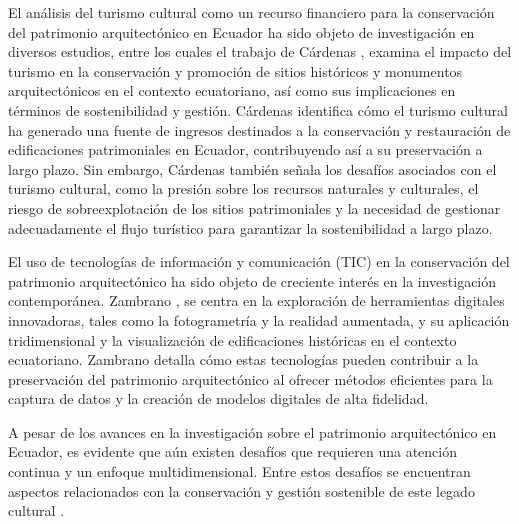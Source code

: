 \documentclass[journal,article,submit,pdftex,moreauthors]{Definitions/mdpi}
\begin{document}
El análisis del turismo cultural como un recurso financiero para la conservación del patrimonio arquitectónico en Ecuador ha sido objeto de investigación en diversos estudios, entre los cuales el trabajo de Cárdenas \cite{art:articulo19}, examina el impacto del turismo en la conservación y promoción de sitios históricos y monumentos arquitectónicos en el contexto ecuatoriano, así como sus implicaciones en términos de sostenibilidad y gestión. Cárdenas identifica cómo el turismo cultural ha generado una fuente de ingresos destinados a la conservación y restauración de edificaciones patrimoniales en Ecuador, contribuyendo así a su preservación a largo plazo. Sin embargo, Cárdenas también señala los desafíos asociados con el turismo cultural, como la presión sobre los recursos naturales y culturales, el riesgo de sobreexplotación de los sitios patrimoniales y la necesidad de gestionar adecuadamente el flujo turístico para garantizar la sostenibilidad a largo plazo.

El uso de tecnologías de información y comunicación (TIC) en la conservación del patrimonio arquitectónico ha sido objeto de creciente interés en la investigación contemporánea. Zambrano \cite{art:articulo20}, se centra en la exploración de herramientas digitales innovadoras, tales como la fotogrametría y la realidad aumentada, y su aplicación tridimensional y la visualización de edificaciones históricas en el contexto ecuatoriano. Zambrano detalla cómo estas tecnologías pueden contribuir a la preservación  del patrimonio arquitectónico al ofrecer métodos eficientes para la captura de datos y la creación de modelos digitales de alta fidelidad.

A pesar de los avances en la investigación sobre el patrimonio arquitectónico en Ecuador, es evidente que aún existen desafíos que requieren una atención continua y un enfoque multidimensional. Entre estos desafíos se encuentran aspectos relacionados con la conservación y gestión sostenible de este legado cultural \cite{art:articulo22}.  
 
\end{document}
